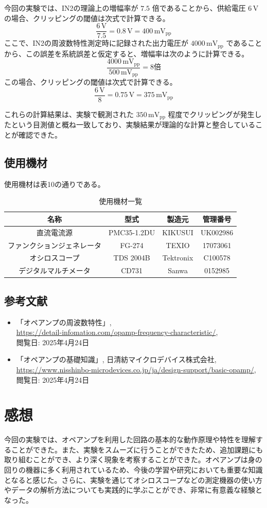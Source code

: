 \documentclass{jlreq}
\numberwithin{equation}{section}
\begin{document}
今回の実験では、IN2の理論上の増幅率が \(7.5\) 倍であることから、供給電圧 \(6 \, \mathrm{V}\) の場合、クリッピングの閾値は次式で計算できる。
\[
\frac{6 \, \mathrm{V}}{7.5} = 0.8 \, \mathrm{V} = 400 \, \mathrm{mV_{pp}}
\]
ここで、IN2の周波数特性測定時に記録された出力電圧が \(4000 \, \mathrm{mV_{pp}}\) であることから、この誤差を系統誤差と仮定すると、増幅率は次のように計算できる。
\[
\frac{4000 \, \mathrm{mV_{pp}}}{500 \, \mathrm{mV_{pp}}} = 8倍
\]
この場合、クリッピングの閾値は次式で計算できる。
\[
\frac{6 \, \mathrm{V}}{8} = 0.75 \, \mathrm{V} = 375 \, \mathrm{mV_{pp}}
\]

これらの計算結果は、実験で観測された \(350 \, \mathrm{mV_{pp}}\) 程度でクリッピングが発生したという目測値と概ね一致しており、実験結果が理論的な計算と整合していることが確認できた。

\subsection{使用機材}
使用機材は表10の通りである。
\begin{table}[H]
  \centering
  \caption{使用機材一覧}
  \begin{tabular}{|c|c|c|c|}
    \hline
    名称 & 型式 & 製造元 & 管理番号 \\ \hline
    直流電流源 & PMC35-1.2DU & KIKUSUI & UK002986 \\ \hline
    ファンクションジェネレータ & FG-274 & TEXIO & 17073061 \\ \hline
    オシロスコープ & TDS 2004B & Tektronix & C100578 \\ \hline
    デジタルマルチメータ & CD731 & Sanwa & 0152985 \\ \hline
  \end{tabular}
\end{table}

\subsection{参考文献}
\begin{itemize}
  \item 「オペアンプの周波数特性」, \\
  \url{https://detail-infomation.com/opamp-frequency-characteristic/}, \\
  閲覧日: 2025年4月24日
  \item 「オペアンプの基礎知識」, 日清紡マイクロデバイス株式会社, \\
  \url{https://www.nisshinbo-microdevices.co.jp/ja/design-support/basic-opamp/}, \\
  閲覧日: 2025年4月24日
\end{itemize}

\section{感想}
今回の実験では、オペアンプを利用した回路の基本的な動作原理や特性を理解することができた。また、実験をスムーズに行うことができたため、追加課題にも取り組むことができ、より深く現象を考察することができた。オペアンプは身の回りの機器に多く利用されているため、今後の学習や研究においても重要な知識となると感じた。さらに、実験を通じてオシロスコープなどの測定機器の使い方やデータの解析方法についても実践的に学ぶことができ、非常に有意義な経験となった。
\end{document}
